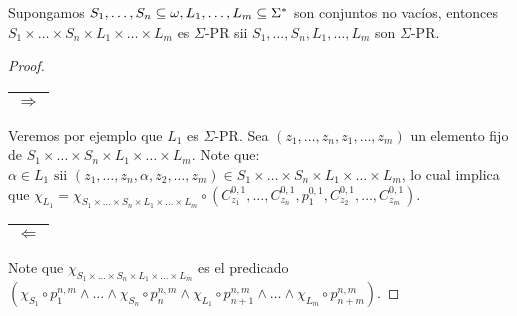   \begin{lemma}
    \par Supongamos $S_{1}, \dotsc, S_{n} \subseteq \omega, L_{1}, \dotsc, L_{m} \subseteq \Sigma^{\ast}$ son conjuntos no
    vacíos, entonces $S_{1} \times \dotsc \times S_{n} \times L_{1} \times \dotsc \times L_{m}$ es $\Sigma$-PR sii
    $S_{1}, \dotsc, S_{n}, L_{1}, \dotsc, L_{m}$ son $\Sigma$-PR.
  \end{lemma}
  \begin{proof}
    \begin{tabular}{|c|} \hline $\Rightarrow$\\\hline \end{tabular} Veremos por ejemplo que $L_{1}$ es $\Sigma$-PR. Sea
      $(z_{1}, \dotsc, z_{n}, z_{1}, \dotsc, z_{m})$ un elemento fijo de $S_{1} \times \dotsc \times S_{n}
      \times L_{1} \times \dotsc \times L_{m}$. Note que: $\alpha \in L_{1} \text{ sii } (z_{1}, \dotsc, z_{n}, \alpha,
      z_{2}, \dotsc, z_{m}) \in S_{1} \times \dotsc \times S_{n} \times L_{1} \times \dotsc \times L_{m}$,
      lo cual implica que $\chi_{L_{1}} = \chi_{S_{1} \times \dotsc \times S_{n} \times L_{1} \times \dotsc \times
      L_{m}} \circ (C_{z_{1}}^{0, 1}, \dotsc, C_{z_{n}}^{0, 1}, p_{1}^{0, 1}, C_{z_{2}}^{0, 1}, \dotsc,
      C_{z_{m}}^{0, 1})$.

    \begin{tabular}{|c|} \hline $\Leftarrow$\\\hline \end{tabular} Note que $\chi_{S_{1} \times \dotsc \times S_{n}
      \times L_{1} \times \dotsc \times L_{m}}$ es el predicado $(\chi_{S_{1}} \circ p_{1}^{n, m} \wedge \dotsc \wedge
      \chi_{S_{n}} \circ p_{n}^{n, m} \wedge \chi_{L_{1}} \circ p_{n+1}^{n, m} \wedge \dotsc \wedge \chi_{L_{m}} \circ
      p_{n+m}^{n, m})$.
  \end{proof}

